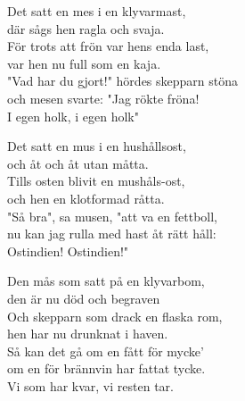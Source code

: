\documentclass[a6paper, 10pt, twoside]{article}
\begin{document}
\newpage
\noindent
\begin{center}
\end{center}
\begin{lyrics}
Det satt en mes i en klyvarmast,\\
där sågs hen ragla och svaja.\\
För trots att frön var hens enda last,\\
var hen nu full som en kaja.\\
"Vad har du gjort!" hördes skepparn stöna\\
och mesen svarte: "Jag rökte fröna!\\
I egen holk, i egen holk"
\end{lyrics}
\begin{center}
\end{center}
\begin{lyrics}
Det satt en mus i en hushållsost,\\
och åt och åt utan måtta.\\
Tills osten blivit en mushåls-ost,\\
och hen en klotformad råtta.\\
"Så bra", sa musen, "att va en fettboll,\\
nu kan jag rulla med hast åt rätt håll:\\
Ostindien! Ostindien!"
\end{lyrics}
\begin{center}
\end{center}
\begin{lyrics}
Den mås som satt på en klyvarbom,\\
den är nu död och begraven\\
Och skepparn som drack en flaska rom,\\
hen har nu drunknat i haven.\\
Så kan det gå om en fått för mycke'\\
om en för brännvin har fattat tycke.\\
Vi som har kvar, vi resten tar.
\end{lyrics}
\end{document}
